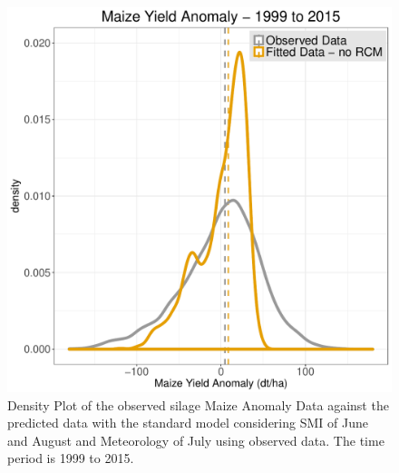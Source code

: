 \documentclass[12pt]{iopart}
\begin{document}
\begin{figure}
	\label{density:1f}
	\centering
	\includegraphics[width=1\textwidth]{figures/Density_1999-2015_Anomalies_sMA_lm_fit_SMI_6_Jun_Aug.pdf}
	\caption{Density Plot of the observed silage Maize Anomaly Data against the predicted data with the standard model considering SMI of June and August and
		Meteorology of July using observed data. The time period is 1999 to 2015.}
\end{figure}



\end{document}
